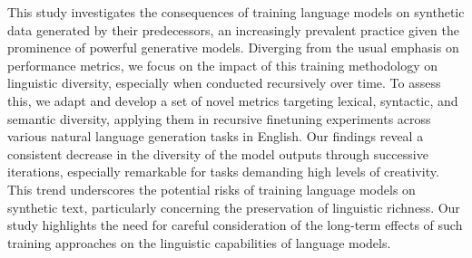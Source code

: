 This study investigates the consequences of training language models on synthetic data generated by their predecessors, an increasingly prevalent practice given the prominence of powerful generative models. Diverging from the usual emphasis on performance metrics, we focus on the impact of this training methodology on linguistic diversity, especially when conducted recursively over time. To assess this, we adapt and develop a set of novel metrics targeting lexical, syntactic, and semantic diversity, applying them in recursive finetuning experiments across various natural language generation tasks in English. Our findings reveal a consistent decrease in the diversity of the model outputs through successive iterations, especially remarkable for tasks demanding high levels of creativity. This trend underscores the potential risks of training language models on synthetic text, particularly concerning the preservation of linguistic richness. Our study highlights the need for careful consideration of the long-term effects of such training approaches on the linguistic capabilities of language models.